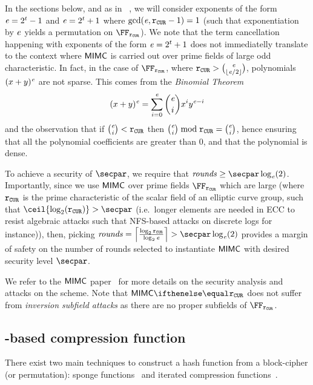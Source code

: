 \medskip

In the sections below, and as in ~\cite{albrecht2016mimc}, we will consider exponents of the form $\mathit{e}{} = 2^t-1$ and $\mathit{e}{} = 2^t+1$ where $\gcd(\mathit{e}{}, \mathtt{r_{CUR}}-1) = 1$ (such that exponentiation by $\mathit{e}{}$ yields a permutation on $\FFx{\rCURVE}$). We note that the term cancellation happening with exponents of the form $\mathit{e}{} = 2^t+1$ does not immediatelly translate to the context where $\mathsf{MIMC{}}$ is carried out over prime fields of large odd characteristic. In fact, in the case of $\FFx{\rCURVE}$, where $\mathtt{r_{CUR}} > \binom{\mathit{e}}{\lfloor \mathit{e} / 2
  \rfloor}$, polynomials $(x + y)^{\mathit{e}}$ are not sparse. This comes from the \emph{Binomial Theorem}
\[
  (x + y)^{\mathit{e}} = \sum_{i = 0}^{\mathit{e}} \binom{\mathit{e}}{i} x^{i}y^{\mathit{e} - i}
\]
and the observation that if $\binom{\mathit{e}}{i} < \mathtt{r_{CUR}}$ then $\binom{\mathit{e}}{i} \bmod \mathtt{r_{CUR}} = \binom{\mathit{e}}{i}$, hence ensuring that all the polynomial coefficients are greater than $0$, and that the polynomial is dense.

To achieve a security of $\secpar$, we require that $\rounds \geq \secpar \log_{\exponent}(2)$.
Importantly, since we use $\mathsf{MIMC{}}$ over prime fields $\FFx{\rCURVE}$ which are large (where $\mathtt{r_{CUR}}$ is the prime characteristic of the scalar field of an elliptic curve group, such that $\ceil{\log_2(\rCURVE)} > \secpar$ (i.e.~longer elements are needed in ECC to resist algebraic attacks such that NFS-based attacks on discrete logs for instance)), then, picking $\rounds = \left\lceil \frac{\log_2 \rCURVE}{\log_2 \exponent{}} \right\rceil > \secpar \log_{\exponent}(2)$ provides a margin of safety on the number of rounds selected to instantiate $\mathsf{MIMC{}}$ with desired security level $\secpar$.

We refer to the $\mathsf{MIMC{}}$ paper~\cite[Section 4.2 and 5.1]{albrecht2016mimc} for more details on the security analysis and attacks on the scheme. Note that $\mimcPrime{\rCURVE}$ does not suffer from \emph{inversion subfield attacks} as there are no proper subfields of $\FFx{\rCURVE}$.

\subsection{\mimc{}-based compression function}\label{instantiation:mkhash:mimc-compressionf}

There exist two main techniques to construct a hash function from a block-cipher (or permutation): sponge functions~\cite{bertoni2007sponge} and iterated compression functions~\cite{black2002black}.

